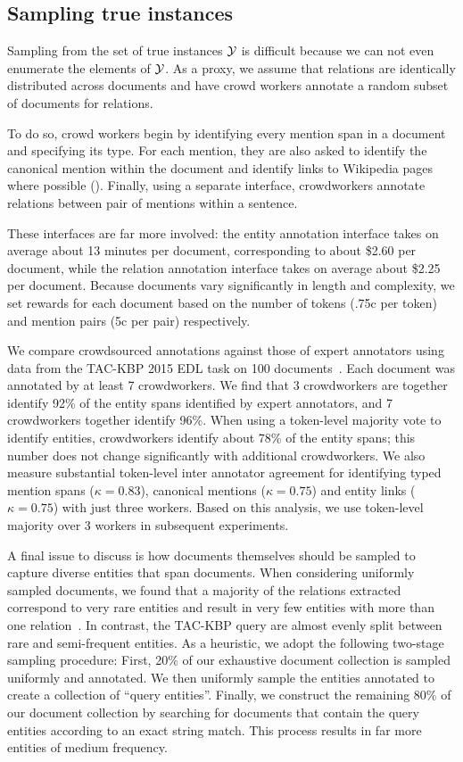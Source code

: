 \subsection{Sampling true instances}
Sampling from the set of true instances $\mathcal{Y}$ is difficult because we can not even enumerate the elements of $\mathcal{Y}$.
As a proxy, we assume that relations are identically distributed across documents and have crowd workers annotate a random subset of documents for relations.

To do so, crowd workers begin by identifying every mention span in a document and specifying its type.
  For each mention, they are also asked to identify the canonical mention within the document
  and identify links to Wikipedia pages where possible ().
Finally, using a separate interface, crowdworkers annotate relations between pair of mentions within a sentence.

These interfaces are far more involved: the entity annotation interface takes on average about 13 minutes per document, corresponding to about \$2.60 per document, while the relation annotation interface takes on average about \$2.25 per document.
Because documents vary significantly in length and complexity, we set rewards for each document based on the number of tokens (.75c per token) and mention pairs (5c per pair) respectively.

We compare crowdsourced annotations against those of expert annotators using data from the TAC-KBP 2015 EDL task on 100 documents~\citep{}.
Each document was annotated by at least 7 crowdworkers.
We find that 3 crowdworkers are together identify 92\% of the entity spans identified by expert annotators,
  and 7 crowdworkers together identify 96\%.
When using a token-level majority vote to identify entities, crowdworkers identify about 78\% of the entity spans; this number does not change significantly with additional crowdworkers.
We also measure substantial token-level inter annotator agreement for identifying typed mention spans ($\kappa = 0.83$), canonical mentions ($\kappa = 0.75$) and entity links ($\kappa = 0.75$) with just three workers.
Based on this analysis, we use token-level majority over 3 workers in subsequent experiments.

A final issue to discuss is how documents themselves should be sampled to capture diverse entities that span documents.
When considering uniformly sampled documents, we found that a majority of the relations extracted correspond to very rare entities and result in very few entities with more than one relation~.
In contrast, the TAC-KBP query are almost evenly split between rare and semi-frequent entities.
As a heuristic, we adopt the following two-stage sampling procedure:
First, 20\% of our exhaustive document collection is sampled uniformly and annotated.
We then uniformly sample the entities annotated to create a collection of ``query entities''.
Finally, we construct the remaining 80\% of our document collection by searching for documents that contain the query entities according to an exact string match. This process results in far more entities of medium frequency.
